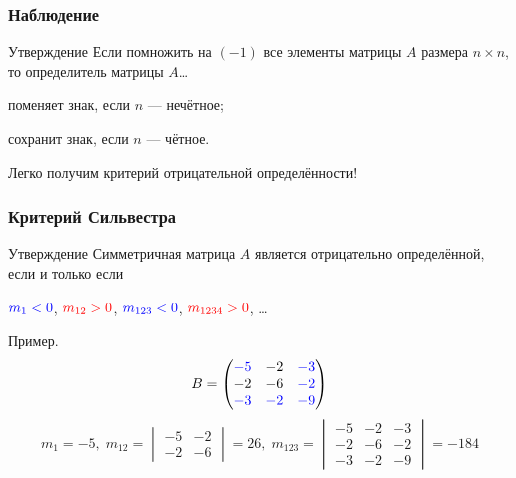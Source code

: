 \begin{frame}
    \frametitle{Наблюдение}

    \begin{block}{Утверждение}
    Если помножить на $(-1)$ все элементы матрицы $A$ размера $n\times n$, то определитель матрицы $A$\ldots \pause

    поменяет знак, если $n$ — нечётное; \pause

    сохранит знак, если $n$ — чётное. 
    \end{block}

    \pause
    Легко получим критерий отрицательной определённости!


\end{frame}

    

\begin{frame}
\frametitle{Критерий Сильвестра}

\begin{block}{Утверждение}
    Симметричная матрица $A$ является отрицательно определённой, если и только если

    $\textcolor{blue}{m_1 < 0}$, $\textcolor{red}{m_{12} > 0}$, $\textcolor{blue}{m_{123} < 0}$, $\textcolor{red}{m_{1234}>0}$, \ldots   \pause   
\end{block}

Пример. 
\[
B = \begin{pmatrix}
    \textcolor{blue}{-5} & -2 & \textcolor{blue}{-3}  \\
    -2 & -6 & \textcolor{blue}{-2} \\
    \textcolor{blue}{-3} & \textcolor{blue}{-2} & \textcolor{blue}{-9} \\
\end{pmatrix}
\]
\[
    m_1 = -5, \; m_{12} = \begin{vmatrix}
        -5 & -2 \\
        -2 & -6
    \end{vmatrix} = 26, \; 
    m_{123} = \begin{vmatrix}
        -5 & -2 & -3 \\
        -2 & -6 & -2 \\
        -3 & -2 & -9
    \end{vmatrix}=  -184
\]



\end{frame}







